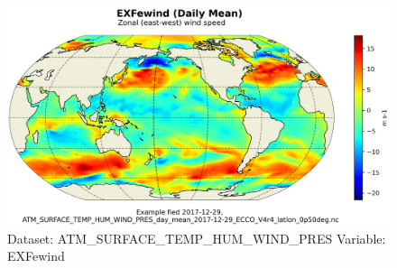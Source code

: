 \begin{figure}[H]
\centering
\includegraphics[scale=0.55]{../images/plots/latlon_plots/Atmosphere_Surface_Temperature_Humidity_Wind_and_Pressure/EXFewind.png}
\caption{Dataset: ATM\_SURFACE\_TEMP\_HUM\_WIND\_PRES Variable: EXFewind}
\label{tab:table-ATM_SURFACE_TEMP_HUM_WIND_PRES_EXFewind-Plot}
\end{figure}
\pagebreak
